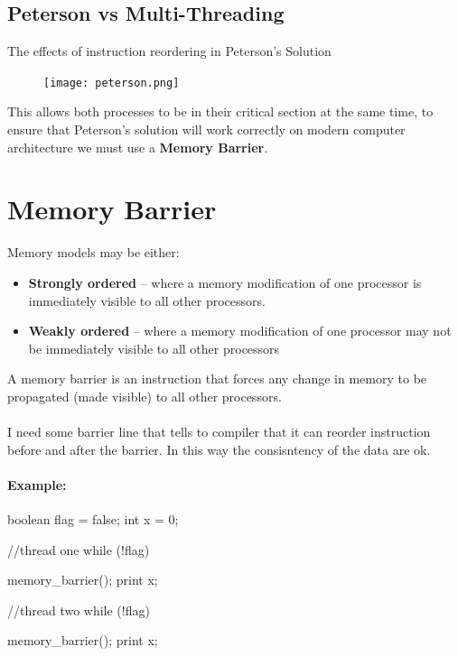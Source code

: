 \subsection{Peterson vs Multi-Threading}
The effects of instruction reordering in Peterson’s Solution

\begin{figure}[htbp]
    \centering
    \texttt{[image: peterson.png]}    
    
\end{figure}

This allows both processes to be in their critical section at the same
time, to ensure that Peterson’s solution will work correctly on modern
computer architecture we must use a \textbf{Memory Barrier}.
\newpage
\section{Memory Barrier}

Memory models may be either:

\begin{itemize}
    \item \textbf{Strongly ordered} – where a memory modification of one processor is immediately visible to all other processors.
    \item \textbf{Weakly ordered} – where a memory modification of one processor may not be immediately visible to all other processors
\end{itemize}

A memory barrier is an instruction that forces any change in memory to be propagated (made visible) to all other processors.

\paragraph{}
I need some barrier line that tells to compiler that it can reorder instruction before and after the barrier. In this way the consisntency of the data are ok.

\paragraph{Example:} boolean flag = false; int x = 0;
\begin{codeInC}
//thread one
while (!flag)

memory_barrier();
print x;
\end{codeInC}
\begin{codeInC}
//thread two
while (!flag)

memory_barrier();
print x;
\end{codeInC}

